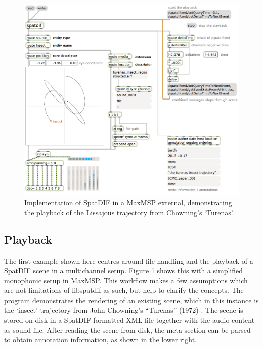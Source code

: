 \documentclass{article}
\begin{document}
\begin{figure}[httb]
	\centering
	\includegraphics[width=\columnwidth]{playback_maxpatch.png}
	\caption{Implementation of SpatDIF in a MaxMSP external, demonstrating the playback of the Lissajous trajectory from Chowning's `Turenas'.} 
	\label{fig:screenshot}
\end{figure}

\subsection{Playback}\label{subsec:playback}

The first example shown here centres around file-handling and the playback of a SpatDIF scene in a multichannel setup.
Figure \ref{fig:screenshot} shows this with a simplified monophonic setup in MaxMSP.
This workflow makes a few assumptions which are not limitations of libspatdif as such, but help to clarify the concepts.
The program demonstrates the rendering of an existing scene, which in this instance is the `insect' trajectory from John Chowning's ``Turenas'' (1972) \cite{chowningturenas}.
The scene is stored on disk in a SpatDIF-formatted XML-file together with the audio content as sound-file.
After reading the scene from disk, the meta section can be parsed to obtain annotation information, as shown in the lower right.
\end{document}
